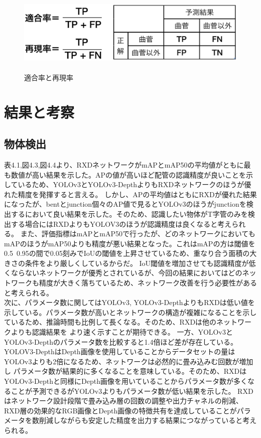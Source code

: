 \begin{figure}[htbt]
	\centering
	 \includegraphics[height=40mm]{recall.eps}
	 \caption{適合率と再現率}
	 \label{fig:f2}
\end{figure}
\clearpage

\section{結果と考察}
\subsection{物体検出}
表4.1,図4.3,図4.4より、RXDネットワークがmAPとmAP50の平均値がともに最も数値が高い結果を示した。APの値が高いほど配管の認識精度が良いことを示しているため、YOLOv3とYOLOv3-DepthよりもRXDネットワークのほうが優れた精度を発揮すると言える。
しかし、APの平均値はともにRXDが優れた結果になったが、bentとjunction個々のAP値で見るとYOLOv3のほうがjunctionを検出するにおいて良い結果を示した。そのため、認識したい物体がT字管のみを検出する場合にはRXDよりもYOLOV3のほうが認識精度は良くなると考えられる。
また、評価指標はmAPとmAP50で行ったが、どのネットワークにおいてもmAPのほうがmAP50よりも精度が悪い結果となった。これはmAPの方は閾値を0.5~0.95の間で0.05刻みでIoUの閾値を上昇させているため、重なり合う面積の大きさの条件をより厳しくしているからだ。
IoU閾値を増加させても認識精度が低くならないネットワークが優秀とされているが、今回の結果においてはどのネットワークも精度が大きく落ちているため、ネットワーク改善を行う必要性があると考えられる。\\
次に、パラメータ数に関してはYOLOv3, YOLOv3-DepthよりもRXDは低い値を示している。パラメータ数が高いとネットワークの構造が複雑になることを示しているため、推論時間も比例して長くなる。そのため、RXDは他のネットワークよりも認識結果を
より速く示すことが期待できる。
一方、YOLOv3とYOLOv3-Depthのパラメータ数を比較すると1.4倍ほど差が存在している。YOLOV3-DepthはDepth画像を使用していることからデータセットの量はYOLOv3よりも2倍になるため、ネットワークは必然的に畳み込みむ回数が増加し
パラメータ数が結果的に多くなることを意味している。そのため、RXDはYOLOv3-Depthと同様にDepth画像を用いていることからパラメータ数が多くなることが予測できるがYOLOv3よりもパラメータ数が低い結果を示した。
RXDはネットワーク設計段階で畳み込み層の回数の調整や出力チャネルの削減、RXD層の効果的なRGB画像とDepth画像の特徴共有を達成していることがパラメータを数削減しながらも安定した精度を出力する結果につながっていると考えられる。\\




